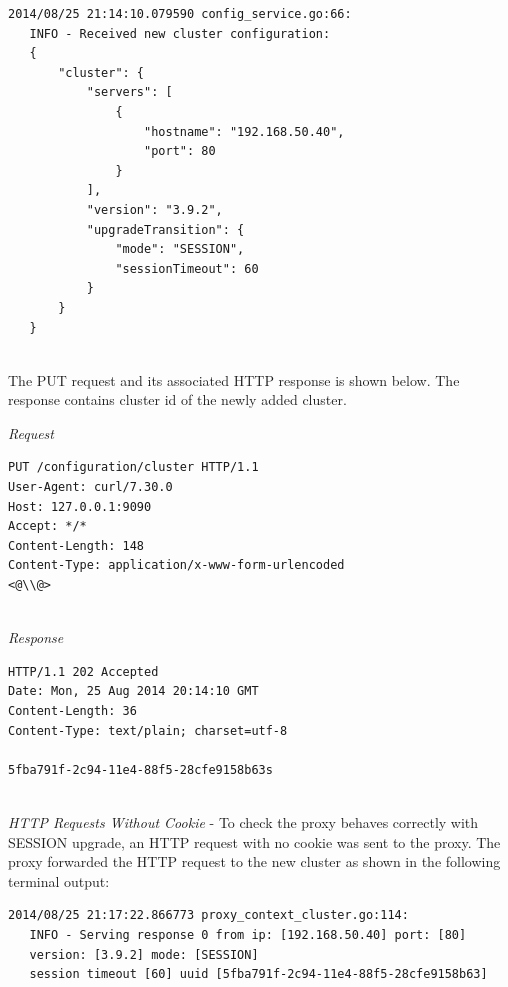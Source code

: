 \documentclass[a4paper,11pt,twoside]{report}
\begin{document}
\begin{lstlisting}[language=terminal] 
2014/08/25 21:14:10.079590 config_service.go:66:     
   INFO - Received new cluster configuration:
   {
       "cluster": {
           "servers": [
               {
                   "hostname": "192.168.50.40",
                   "port": 80
               }
           ],
           "version": "3.9.2",
           "upgradeTransition": {
               "mode": "SESSION",
               "sessionTimeout": 60
           }
       }
   }
\end{lstlisting}   

\noindent\\
The PUT request and its associated HTTP response is shown below. The response contains cluster id of the newly added cluster.\smallskip 

\noindent
\textit{Request}
\begin{lstlisting}[language=terminal]
PUT /configuration/cluster HTTP/1.1
User-Agent: curl/7.30.0
Host: 127.0.0.1:9090
Accept: */*
Content-Length: 148
Content-Type: application/x-www-form-urlencoded
<@\\@>
\end{lstlisting}

\noindent\\
\textit{Response}
\begin{lstlisting}[language=terminal]
HTTP/1.1 202 Accepted
Date: Mon, 25 Aug 2014 20:14:10 GMT
Content-Length: 36
Content-Type: text/plain; charset=utf-8

5fba791f-2c94-11e4-88f5-28cfe9158b63s
\end{lstlisting}  

\noindent\\
\textit{HTTP Requests Without Cookie} - To check the proxy behaves correctly with SESSION upgrade, an HTTP request with no cookie was sent to the proxy. The proxy forwarded the HTTP request to the new cluster as shown in the following terminal output: \smallskip   


\begin{lstlisting}[language=terminal]
2014/08/25 21:17:22.866773 proxy_context_cluster.go:114:     
   INFO - Serving response 0 from ip: [192.168.50.40] port: [80] 
   version: [3.9.2] mode: [SESSION] 
   session timeout [60] uuid [5fba791f-2c94-11e4-88f5-28cfe9158b63]
\end{lstlisting}
\end{document}
